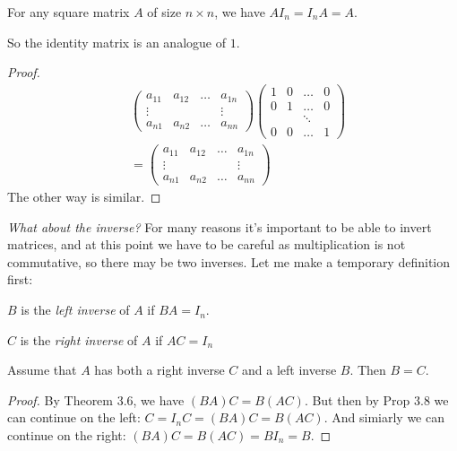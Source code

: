 \documentclass[10pt]{scrartcl}
\begin{document}
\begin{proposition}
For any square matrix $A$ of size $n \times n$, we have $AI_n = I_nA = A$.
\end{proposition}
So the identity matrix is an analogue of $1$. 
\begin{proof}
\begin{align*}
 &\begin{pmatrix}
  a_{11} & a_{12} & \dots & a_{1n}\\
  \vdots &&&\vdots\\
  a_{n1} & a_{n2} & \dots & a_{nn}	
  \end{pmatrix}
   \begin{pmatrix}
  1 & 0 & \dots & 0\\
  0 & 1 & \dots & 0\\
   & & \ddots & \\
  0 & 0 & \dots & 1	
  \end{pmatrix}\\
  &= 
  \begin{pmatrix}
  a_{11} & a_{12} & \dots & a_{1n}\\
  \vdots &&&\vdots\\
  a_{n1} & a_{n2} & \dots & a_{nn}	
  \end{pmatrix}
\end{align*}
The other way is similar.
\end{proof}

\emph{What about the inverse?} For many reasons it's important to be able to invert matrices, and at this point we have to be careful as multiplication is not commutative, so there may be two inverses. Let me make a temporary definition first:\\

\begin{definition}
$B$ is the \emph{left inverse} of $A$ if $BA  =I_n$.

$C$ is the \emph{right inverse} of $A$ if $AC = I_n$
\end{definition}\vsp

\begin{proposition}
Assume that $A$ has both a right inverse $C$ and a left inverse $B$. Then $B = C$.
\end{proposition}

\begin{proof}
By Theorem 3.6, we have $(BA)C = B(AC)$. But then by Prop 3.8 we can continue on the left: $C = I_nC = (BA)C = B(AC)$. And simiarly we can continue on the right: 
$(BA)C = B(AC) = BI_n = B$.   
\end{proof}
\end{document}
